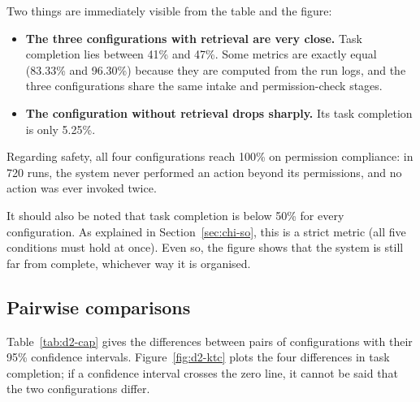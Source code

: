 
Two things are immediately visible from the table and the figure:

\begin{itemize}
    \item \textbf{The three configurations with retrieval are very close.} Task completion lies between 41\% and 47\%. Some metrics are exactly equal (83.33\% and 96.30\%) because they are computed from the run logs, and the three configurations share the same intake and permission-check stages.
    \item \textbf{The configuration without retrieval drops sharply.} Its task completion is only 5.25\%.
\end{itemize}

Regarding safety, all four configurations reach 100\% on permission compliance: in 720 runs, the system never performed an action beyond its permissions, and no action was ever invoked twice.

It should also be noted that task completion is below 50\% for every configuration. As explained in Section~\ref{sec:chi-so}, this is a strict metric (all five conditions must hold at once). Even so, the figure shows that the system is still far from complete, whichever way it is organised.

\subsection{Pairwise comparisons}

Table~\ref{tab:d2-cap} gives the differences between pairs of configurations with their 95\% confidence intervals. Figure~\ref{fig:d2-ktc} plots the four differences in task completion; if a confidence interval crosses the zero line, it cannot be said that the two configurations differ.

